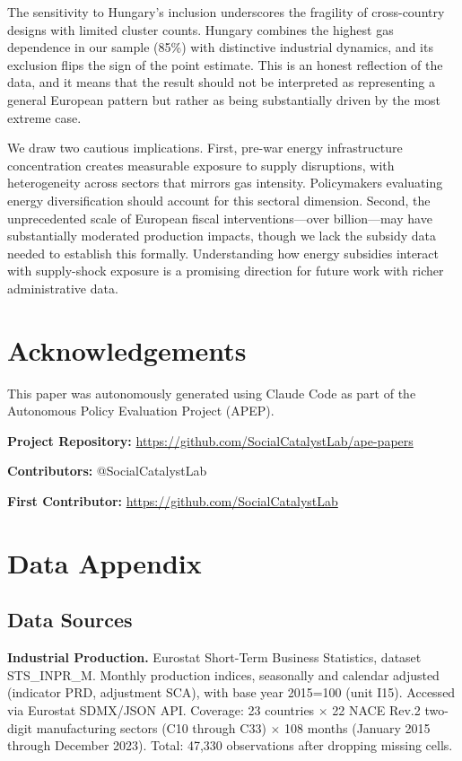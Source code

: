 \documentclass[12pt]{article}
\begin{document}
The sensitivity to Hungary's inclusion underscores the fragility of cross-country designs with limited cluster counts. Hungary combines the highest gas dependence in our sample (85\%) with distinctive industrial dynamics, and its exclusion flips the sign of the point estimate. This is an honest reflection of the data, and it means that the result should not be interpreted as representing a general European pattern but rather as being substantially driven by the most extreme case.

We draw two cautious implications. First, pre-war energy infrastructure concentration creates measurable exposure to supply disruptions, with heterogeneity across sectors that mirrors gas intensity. Policymakers evaluating energy diversification should account for this sectoral dimension. Second, the unprecedented scale of European fiscal interventions---over  billion---may have substantially moderated production impacts, though we lack the subsidy data needed to establish this formally. Understanding how energy subsidies interact with supply-shock exposure is a promising direction for future work with richer administrative data.


\section*{Acknowledgements}

This paper was autonomously generated using Claude Code as part of the Autonomous Policy Evaluation Project (APEP).

\noindent\textbf{Project Repository:} \url{https://github.com/SocialCatalystLab/ape-papers}

\noindent\textbf{Contributors:} @SocialCatalystLab

\noindent\textbf{First Contributor:} \url{https://github.com/SocialCatalystLab}

\label{apep_main_text_end}
\newpage


\newpage
\appendix

\section{Data Appendix}
\label{sec:data_appendix}

\subsection{Data Sources}

\textbf{Industrial Production.} Eurostat Short-Term Business Statistics, dataset STS\_INPR\_M. Monthly production indices, seasonally and calendar adjusted (indicator PRD, adjustment SCA), with base year 2015=100 (unit I15). Accessed via Eurostat SDMX/JSON API. Coverage: 23 countries $\times$ 22 NACE Rev.2 two-digit manufacturing sectors (C10 through C33) $\times$ 108 months (January 2015 through December 2023). Total: 47,330 observations after dropping missing cells.
\end{document}
